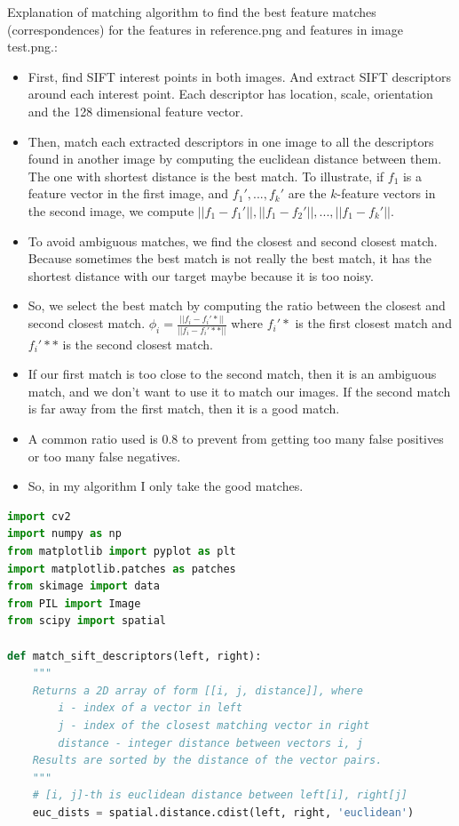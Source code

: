 \documentclass{exam}
\begin{document}
\begin{questions}
\begin{parts}
Explanation of matching algorithm to find the best feature matches (correspondences) for the features in reference.png and features in image test.png.:
\begin{itemize}
\item First, find SIFT interest points in both images. And extract SIFT descriptors around each interest point. Each descriptor has location, scale, orientation and the 128 dimensional feature vector. 
\item Then, match each extracted descriptors in one image to all the descriptors found in another image by computing the euclidean distance between them. The one with shortest distance is the best match. To illustrate, if $f_{1}$ is a feature vector in the first image, and $f_{1}', ..., f_{k}'$ are the $k$-feature vectors in the second image, we compute $||f_{1} - f_{1}'||, ||f_{1} - f_{2}'||, ..., ||f_{1} - f_{k}'||$. 
\item To avoid ambiguous matches, we find the closest and second closest match. Because sometimes the best match is not really the best match, it has the shortest distance with our target maybe because it is too noisy.
\item So, we select the best match by computing the ratio between the closest and second closest match. $\phi_{i} = \frac{||f_{i} - f_{i}'*||}{||f_{i} - f_{i}'**||}$ where $f_{i}'*$ is the first closest match and $f_{i}'**$ is the second closest match. 
\item If our first match is too close to the second match, then it is an ambiguous match, and we don't want to use it to match our images. If the second match is far away from the first match, then it is a good match.
\item A common ratio used is 0.8 to prevent from getting too many false positives or too many false negatives. 
\item So, in my algorithm I only take the good matches.
\end{itemize}

\begin{lstlisting}[language=python, frame=single]
import cv2
import numpy as np
from matplotlib import pyplot as plt
import matplotlib.patches as patches
from skimage import data
from PIL import Image
from scipy import spatial

def match_sift_descriptors(left, right):
    """
    Returns a 2D array of form [[i, j, distance]], where
        i - index of a vector in left
        j - index of the closest matching vector in right
        distance - integer distance between vectors i, j
    Results are sorted by the distance of the vector pairs.
    """  
    # [i, j]-th is euclidean distance between left[i], right[j]
    euc_dists = spatial.distance.cdist(left, right, 'euclidean')
    

\end{lstlisting}
\end{parts}
\end{questions}
\end{document}
